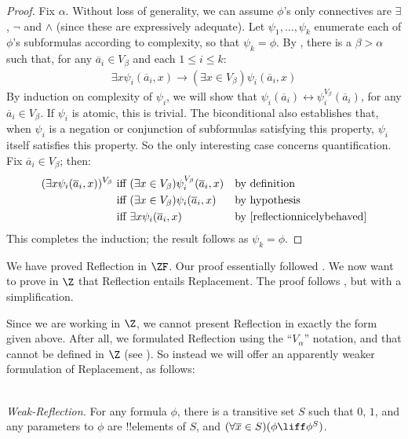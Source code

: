 \documentclass[../../../include/open-logic-section]{subfiles}
\begin{document}
\begin{proof}[Proof] 
Fix $\alpha$. Without loss of generality, we can assume $\phi$'s only
connectives are $\exists$, $\lnot$ and $\land$ (since these are
expressively adequate). Let $\psi_1, \ldots, \psi_k$ enumerate each of
$\phi$'s subformulas according to complexity, so that $\psi_k = \phi$.
By , there is a $\beta > \alpha$ such that, for
any $\overline{a}_i \in V_\beta$ and each $1 \leq i \leq k$:
\begin{align}\label{reflectionnicelybehaved}
	\exists x\psi_i(\overline{a}_i, x) \rightarrow 
	(\exists x \in V_\beta) \psi_i(\overline{a}_i, x)\tag{*}
\end{align}
By induction on complexity of $\psi_i$, we will show that
$\psi_i(\overline{a}_i) \leftrightarrow
\psi_i^{V_\beta}(\overline{a}_i)$, for any  $\overline{a}_i \in
V_\beta$. 	If $\psi_i$ is atomic, this is trivial. The biconditional
also establishes that, when $\psi_i$ is a negation or conjunction of
subformulas satisfying this property, $\psi_i$ itself satisfies this
property. So the only interesting case concerns quantification. Fix
$\overline{a}_i \in V_\beta$; then:
\begin{align*}
	(\exists x \psi_i(\overline{a}_i, x))^{V_\beta}
	&\text{ iff }
	(\exists x \in V_\beta)\psi_i^{V_\beta}(\overline{a}_i, x)
	&&\text{by definition}\\
	&\text{ iff }
	(\exists x \in V_\beta)\psi_i(\overline{a}_i,  x)
	&&\text{by hypothesis}\\
	&\text{ iff }
	\exists x \psi_i(\overline{a}_i, x)
	&&\text{by \eqref{reflectionnicelybehaved}}
\end{align*}
This completes the induction; the result follows as $\psi_k = \phi$.
\end{proof}

We have proved Reflection in $\ZF$. Our proof essentially
followed \citet{Montague1961}. We now want to prove in $\Z$ that
Reflection entails Replacement. The proof follows \citet{Levy1960},
but with a simplification. 

Since we are working in $\Z$, we cannot present Reflection in exactly
the form given above. After all, we formulated Reflection using the
``$V_\alpha$'' notation, and that cannot be defined in $\Z$ (see ). So
instead we will offer an apparently weaker formulation of Replacement,
as follows:

\ \\\emph{Weak-Reflection.} For any formula $\phi$, there is a
transitive set $S$ such that $0$, $1$, and any parameters to $\phi$
are !!{element}s of $S$, and $(\forall \overline{x} \in S)(\phi \liff
\phi^S)$.
\end{document}
